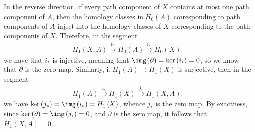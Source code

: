 \documentclass[10pt]{mypackage}
\begin{document}
\begin{solution}
\begin{enumerate}[(a)]
      In the reverse direction, if every path component of $X$ contains at most one path component of $A$, then the homology classes in $H_0\left( A \right)$ corresponding to path components of $A$ inject into the homology classes of $X$ corresponding to the path components of $X$. Therefore, in the segment
      \begin{align*}
        H_1\left( X,A \right)\xrightarrow{\partial}H_0\left( A \right)\xrightarrow{i_{\ast}}H_0\left( X \right),
      \end{align*}
      we have that $i_{\ast}$ is injective, meaning that $\img\left( \partial \right) = \ker\left( i_{\ast} \right) = 0$, so we know that $\partial$ is the zero map. Similarly, if $H_1\left( A \right)\rightarrow H_1\left( X \right)$ is surjective, then in the segment
      \begin{align*}
        H_1\left( A \right)\xrightarrow{i_{\ast}}H_1\left( X \right)\xrightarrow{j_{\ast}}H_1\left( X,A \right),
      \end{align*}
      we have $\ker\left( j_{\ast} \right) = \img\left( i_{\ast} \right) = H_1\left( X \right)$, whence $j_{\ast}$ is the zero map. By exactness, since $\ker\left( \partial \right) = \img\left( j_{\ast} \right) = 0$, and $\partial$ is the zero map, it follows that $H_1\left( X,A \right) = 0$.
  \end{enumerate}
\end{solution}
\end{document}
